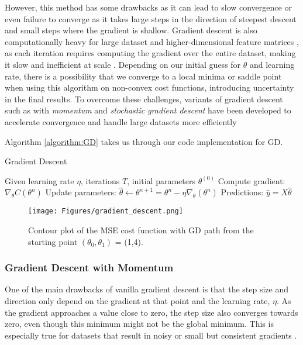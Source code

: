 \documentclass[amssymb,twocolumn,aps]{revtex4}
\begin{document}
However, this method has some drawbacks as it can lead to slow convergence or even failure to converge as it takes large steps in the direction of steepest descent and small steps where the gradient is shallow. Gradient descent is also computationally heavy for large dataset and higher-dimensional feature matrices \cite{fysml4}, as each iteration requires computing the gradient over the entire dataset, making it slow and inefficient at scale \cite{rasch1}. Depending on our initial guess for $\theta$ and learning rate, there is a possibility that we converge to a local minima or saddle point when using this algorithm on non-convex cost functions, introducing uncertainty in the final results. To overcome these challenges, variants of gradient descent such as with \textit{momentum} and \textit{stochastic gradient descent} have been developed to accelerate convergence and handle large datasets more efficiently

Algorithm \ref{algorithm:GD} takes us through our code implementation for GD. 

\begin{algorithm}[H]
\caption{Gradient Descent}
\label{algorithm:GD}
\begin{algorithmic}[1]
\State Given learning rate $\eta$, iterations $T$, initial parameters $\theta^{(0)}$
  \State Compute gradient: $\nabla_\theta C(\theta^n)$
  \State Update parameters: $\hat{\theta} \gets \theta^{n+1} = \theta^n - \eta\nabla_\theta(\theta^n)$
\EndFor
\State Predictions: $\hat{y} = X \hat{\theta}$
\end{algorithmic}
\end{algorithm}


\begin{figure}[H]
    \centering
    \texttt{[image: Figures/gradient\_descent.png]}
    \caption{Contour plot of the MSE cost function with GD path from the starting point $(\theta_0, \theta_1)$ = (1,4).}
    \label{fig:gd}
\end{figure}



\subsubsection{Gradient Descent with Momentum}
One of the main drawbacks of vanilla gradient descent is that the step size and direction only depend on the gradient at that point and the learning rate, $\eta$. As the gradient approaches a value close to zero, the step size also converges towards zero, even though this minimum might not be the global minimum. This is especially true for datasets that result in noisy or small but consistent gradients \cite{Goodfellow-et-al-2016}.
\end{document}
